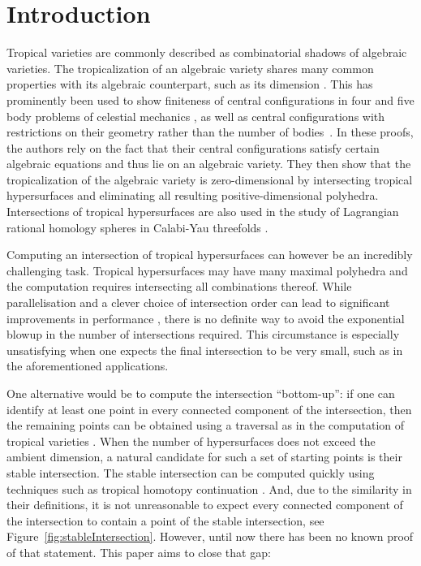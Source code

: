 \section{Introduction}

Tropical varieties are commonly described as combinatorial shadows of algebraic varieties. The tropicalization of an algebraic variety shares many common properties with its algebraic counterpart, such as its dimension \cite[Structure Theorem 3.3.5]{MaclaganSturmfels15}. This has prominently been used to show finiteness of central configurations in four and five body problems of celestial mechanics \cite{HamptonMoeckel06,HamptonJensen11}, as well as central configurations with restrictions on their geometry rather than the number of bodies~\cite{HamptonJensen15,DengHampton23}. In these proofs, the authors rely on the fact that their central configurations satisfy certain algebraic equations and thus lie on an algebraic variety. They then show that the tropicalization of the algebraic variety is zero-dimensional by intersecting tropical hypersurfaces and eliminating all resulting positive-dimensional polyhedra. Intersections of tropical hypersurfaces are also used in the study of Lagrangian rational homology spheres in Calabi-Yau threefolds \cite{MakRuddat20}.

Computing an intersection of tropical hypersurfaces can however be an incredibly challenging task. Tropical hypersurfaces may have many maximal polyhedra and the computation requires intersecting all combinations thereof. While parallelisation and a clever choice of intersection order can lead to significant improvements in performance \cite{JSV17}, there is no definite way to avoid the exponential blowup in the number of intersections required. This circumstance is especially unsatisfying when one expects the final intersection to be very small, such as in the aforementioned applications.

One alternative would be to compute the intersection ``bottom-up'': if one can identify at least one point in every connected component of the intersection, then the remaining points can be obtained using a traversal as in the computation of tropical varieties \cite{BJST07,MR20}. When the number of hypersurfaces does not exceed the ambient dimension, a natural candidate for such a set of starting points is their stable intersection. The stable intersection can be computed quickly using techniques such as tropical homotopy continuation \cite{Jensen16}. And, due to the similarity in their definitions, it is not unreasonable to expect every connected component of the intersection to contain a point of the stable intersection, see Figure~\ref{fig:stableIntersection}. However, until now there has been no known proof of that statement. This paper aims to close that gap:

